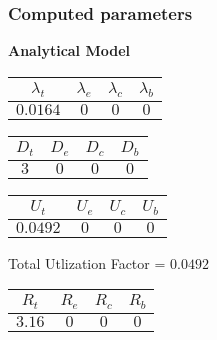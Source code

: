 \documentclass{article}
\begin{document}
\subsubsection{Computed parameters}
\begin{minipage}{0.5\textwidth}
\centering	\textbf{Analytical Model}
\begin{table}[H]
\centering
\begin{tabular}{@{}cccc@{}}
\toprule
$\lambda_t$ & $\lambda_e$ & $\lambda_c$ & $\lambda_b$\\
\midrule
$0.0164$ & $0$ & $0$ & $0$\\
\bottomrule
\end{tabular}
\end{table}\begin{table}[H]
\centering
\begin{tabular}{@{}cccc@{}}
\toprule
$D_t$ & $D_e$ & $D_c$ & $D_b$\\
\midrule
$3$ & $0$ & $0$ & $0$\\
\bottomrule
\end{tabular}
\end{table}\begin{table}[H]
\centering
\begin{tabular}{@{}cccc@{}}
\toprule
$U_t$ & $U_e$ & $U_c$ & $U_b$\\
\midrule
$0.0492$ & $0$ & $0$ & $0$\\
\bottomrule
\end{tabular}
\end{table}
\centering Total Utlization Factor = $0.0492$
\begin{table}[H]
\centering
\begin{tabular}{@{}cccc@{}}
\toprule
$R_t$ & $R_e$ & $R_c$ & $R_b$\\
\midrule
$3.16$ & $0$ & $0$ & $0$\\
\bottomrule
\end{tabular}
\end{table}
\end{minipage}
\end{document}
